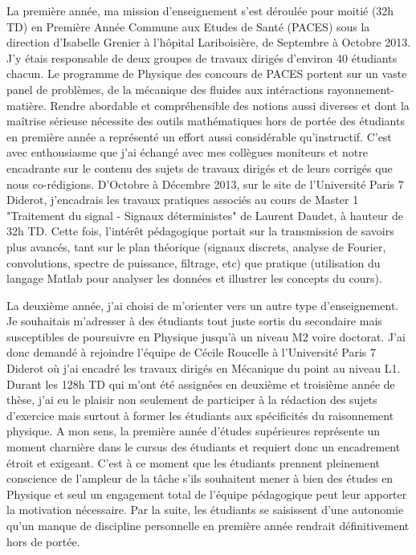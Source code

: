 \documentclass[a4paper,12pt,onecolumn]{article}
\begin{document}
\indent La première année, ma mission d'enseignement s'est déroulée pour moitié (32h TD) en Première Année Commune aux Etudes de Santé (PACES) sous la direction d'Isabelle Grenier à l'hôpital Lariboisière, de Septembre à Octobre 2013. J'y étais responsable de deux groupes de travaux dirigés d'environ 40 étudiants chacun. Le programme de Physique des concours de PACES portent sur un vaste panel de problèmes, de la mécanique des fluides aux intéractions rayonnement-matière. Rendre abordable et compréhensible des notions aussi diverses et dont la maîtrise sérieuse nécessite des outils mathématiques hors de portée des étudiants en première année a représenté un effort aussi considérable qu'instructif. C'est avec enthousiasme que j'ai échangé avec mes collègues moniteurs et notre encadrante sur le contenu des sujets de travaux dirigés et de leurs corrigés que nous co-rédigions. D'Octobre à Décembre 2013, sur le site de l'Université Paris 7 Diderot, j'encadrais les travaux pratiques associés au cours de Master 1 "Traitement du signal - Signaux déterministes" de Laurent Daudet, à hauteur de 32h TD. Cette fois, l'intérêt pédagogique portait sur la transmission de savoirs plus avancés, tant sur le plan théorique (signaux discrets, analyse de Fourier, convolutions, spectre de puissance, filtrage, etc) que pratique (utilisation du langage Matlab pour analyser les données et illustrer les concepts du cours).

\indent La deuxième année, j'ai choisi de m'orienter vers un autre type d'enseignement. Je souhaitais m'adresser à des étudiants tout juste sortis du secondaire mais susceptibles de poursuivre en Physique jusqu'à un niveau M2 voire doctorat. J'ai donc demandé à rejoindre l'équipe de Cécile Roucelle à l'Université Paris 7 Diderot où j'ai encadré les travaux dirigés en Mécanique du point au niveau L1. Durant les 128h TD qui m'ont été assignées en deuxième et troisième année de thèse, j'ai eu le plaisir non seulement de participer à la rédaction des sujets d'exercice mais surtout à former les étudiants aux spécificités du raisonnement physique. A mon sens, la première année d'études supérieures représente un moment charnière dans le cursus des étudiants et requiert donc un encadrement étroit et exigeant. C'est à ce moment que les étudiants prennent pleinement conscience de l'ampleur de la tâche s'ils souhaitent mener à bien des études en Physique et seul un engagement total de l'équipe pédagogique peut leur apporter la motivation nécessaire. Par la suite, les étudiants se saisissent d'une autonomie qu'un manque de discipline personnelle en première année rendrait définitivement hors de portée.
\end{document}
